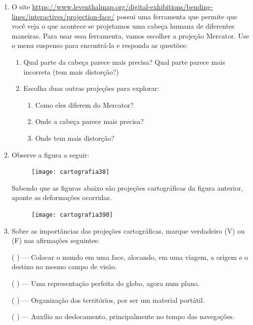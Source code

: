 \exercise

\begin{enumerate}

\item O site \url{https://www.leventhalmap.org/digital-exhibitions/bending-lines/interactives/projection-face/} possui uma ferramenta que permite que você veja o que acontece se projetamos uma cabeça humana de diferentes maneiras.  Para usar essa ferramenta, vamos escolher a projeção Mercator. Use o menu suspenso para encontrá-la e responda as questões:
\begin{enumerate}
\item Qual parte da cabeça parece mais precisa? Qual parte parece mais incorreta (tem mais distorção?)
\item Escolha duas outras projeções para explorar:
\begin{enumerate}
\item Como eles diferem do Mercator?
\item Onde a cabeça parece mais precisa?
\item  Onde tem mais distorção?
\end{enumerate}
\end{enumerate}



\item Observe a figura a seguir: 

\begin{figure}[H]
\centering
\texttt{[image: cartografia38]}
\end{figure}

Sabendo que as figuras abaixo são projeções cartográficas da figura anterior, aponte as deformações ocorridas.

\begin{figure}[H]
\centering
\texttt{[image: cartografia390]}
\end{figure}


\item Sobre as importâncias das projeções cartográficas, marque verdadeiro (V) ou (F) nas afirmações seguintes:

({ }{ }{ }) --- Colocar o mundo em uma face, alocando, em uma viagem, a origem e o destino no mesmo campo de visão.

({ }{ }{ }) --- Uma representação perfeita do globo, agora num plano.

({ }{ }{ }) --- Organização dos territórios, por ser um material portátil.

({ }{ }{ }) --- Auxílio no deslocamento, principalmente no tempo das navegações.


\end{enumerate}
